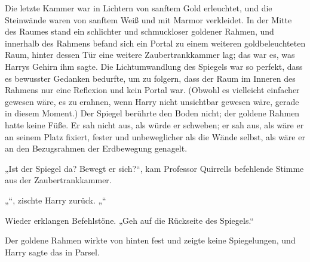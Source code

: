 Die letzte Kammer war in Lichtern von sanftem Gold erleuchtet, und die Steinwände waren von sanftem Weiß und mit Marmor verkleidet.
In der Mitte des Raumes stand ein schlichter und schmuckloser goldener Rahmen, und innerhalb des Rahmens befand sich ein Portal zu einem weiteren goldbeleuchteten Raum, hinter dessen Tür eine weitere Zaubertrankkammer lag; das war es, was Harrys Gehirn ihm sagte. Die Lichtumwandlung des Spiegels war so perfekt, dass es bewusster Gedanken bedurfte, um zu folgern, dass der Raum im Inneren des Rahmens nur eine Reflexion und kein Portal war. (Obwohl es vielleicht einfacher gewesen wäre, es zu erahnen, wenn Harry nicht unsichtbar gewesen wäre, gerade in diesem Moment.)
Der Spiegel berührte den Boden nicht; der goldene Rahmen hatte keine Füße. Er sah nicht aus, als würde er schweben; er sah aus, als wäre er an seinem Platz fixiert, fester und unbeweglicher als die Wände selbst, als wäre er an den Bezugsrahmen der Erdbewegung genagelt.

„Ist der Spiegel da? Bewegt er sich?“, kam Professor Quirrells befehlende Stimme aus der Zaubertrankkammer.

„“, zischte Harry zurück. „“

Wieder erklangen Befehlstöne.
„Geh auf die Rückseite des Spiegels.“

Der goldene Rahmen wirkte von hinten fest und zeigte keine Spiegelungen, und Harry sagte das in Parsel.

